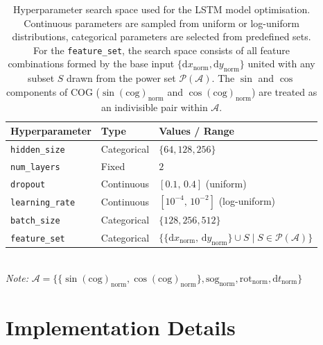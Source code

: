 \begin{table}[t]
    \centering
    \begin{tabular}{lll}
    \toprule
    \textbf{Hyperparameter} & \textbf{Type} & \textbf{Values / Range} \\
    \midrule
    \texttt{hidden\_size}   & Categorical & $\{64, 128, 256\}$ \\
    \texttt{num\_layers}    & Fixed       & $2$ \\
    \texttt{dropout}        & Continuous  & $[0.1,\, 0.4]$ (uniform) \\
    \texttt{learning\_rate} & Continuous  & $[10^{-4},\, 10^{-2}]$ (log-uniform) \\
    \texttt{batch\_size}    & Categorical & $\{128, 256, 512\}$ \\
    \texttt{feature\_set}   & Categorical & $\{\{\mathrm{d}x_{\mathrm{norm}},\, \mathrm{d}y_{\mathrm{norm}}\} \cup S \mid S \in \mathcal{P}(\mathcal{A})\}$ \\
    \bottomrule
    \end{tabular}
    \\[1ex]
    \small \textit{Note:} $\mathcal{A} = \{\{\sin(\mathrm{cog})_{\mathrm{norm}}, \cos(\mathrm{cog})_{\mathrm{norm}}\}, \mathrm{sog}_{\mathrm{norm}}, \mathrm{rot}_{\mathrm{norm}}, \mathrm{d}t_{\mathrm{norm}}\}$
    
    \caption[LSTM Hyperparameter Search Space]{Hyperparameter search space used for the \ac{LSTM} model optimisation. Continuous parameters are sampled from uniform or log-uniform distributions, categorical parameters are selected from predefined sets. For the \texttt{feature\_set}, the search space consists of all feature combinations formed by the base input $\{\mathrm{d}x_{\mathrm{norm}}, \mathrm{d}y_{\mathrm{norm}}\}$ united with any subset $S$ drawn from the power set $\mathcal{P}(\mathcal{A})$. The $\sin$ and $\cos$ components of \acf{COG} ($\sin(\mathrm{cog})_{\mathrm{norm}}$ and $\cos(\mathrm{cog})_{\mathrm{norm}}$) are treated as an indivisible pair within $\mathcal{A}$.}
    \label{tab:lstm-hpo}
\end{table}
                          



\section{Implementation Details}
\label{sec:impldetails}

